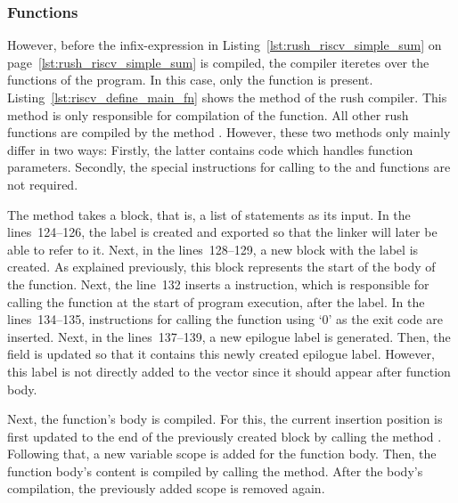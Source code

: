 \subsubsection{Functions}

However, before the infix-expression in Listing~\ref{lst:rush_riscv_simple_sum} on page~\ref{lst:rush_riscv_simple_sum} is compiled, the compiler iteretes over the functions of the program.
In this case, only the  function is present.
Listing~\ref{lst:riscv_define_main_fn} shows the  method of the rush \riscv{} compiler.%
%
%
This method is only responsible for compilation of the  function.
All other rush functions are compiled by the method .
However, these two methods only mainly differ in two ways:
Firstly, the latter contains code which handles function parameters.
Secondly, the special instructions for calling to the  and  functions are not required.

The method takes a block, that is, a list of statements as its input.
In the lines~124--126, the  label is created and exported so that the linker will later be able to refer to it.
Next, in the lines~128--129, a new block with the  label is created.
As explained previously, this block represents the start of the body of the  function.
Next, the line~132 inserts a  instruction, which is responsible for calling the  function at the start of program execution, after the  label.
In the lines~134--135, instructions for calling the  function using `0' as the exit code are inserted.
Next, in the lines~137--139, a new epilogue label is generated.
Then, the  field is updated so that it contains this newly created epilogue label.
However, this label is not directly added to the   vector since it should appear after function body.

Next, the  function's body is compiled.
For this, the current insertion position is first updated to the end of the previously created  block by calling the method .
Following that, a new variable scope is added for the function body.
Then, the function body's content is compiled by calling the  method.
After the body's compilation, the previously added scope is removed again.

